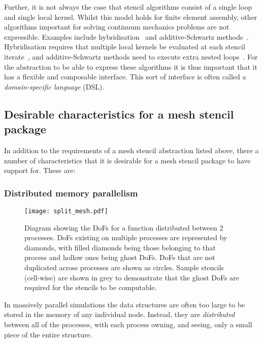 \documentclass[thesis]{subfiles}
\begin{document}
Further, it is not always the case that stencil algorithms consist of a single loop and single local kernel.
Whilst this model holds for finite element assembly, other algorithms important for solving continuum mechanics problems are not expressible.
Examples include hybridisation~\cite{arnoldMixedNonconformingFinite1985,boffi2013mixed} and additive-Schwartz methods~\cite{arnoldPRECONDITIONINGDivAPPLICATIONS1997}.
Hybridisation requires that multiple local kernels be evaluated at each stencil iterate~\cite{gibsonSlateExtendingFiredrake2020}, and additive-Schwartz methods need to execute extra nested loops~\cite{farrellPCPATCHSoftwareTopological2021}.
For the abstraction to be able to express these algorithms it is thus important that it has a flexible and composable interface.
This sort of interface is often called a \emph{domain-specific language} (DSL).

\subsection{Desirable characteristics for a mesh stencil package}
\label{sec:intro_desirable_traits}

In addition to the requirements of a mesh stencil abstraction listed above, there a number of characteristics that it is desirable for a mesh stencil package to have support for.
These are:

\subsubsection{Distributed memory parallelism}
\label{sec:intro_parallelism}

\begin{figure}
  \centering
  \texttt{[image: split\_mesh.pdf]}
  \caption{
    Diagram showing the DoFs for a function distributed between 2 processes.
    DoFs existing on multiple processes are represented by diamonds, with filled diamonds being those belonging to that process and hollow ones being ghost DoFs.
    DoFs that are not duplicated across processes are shown as circles.
    Sample stencils (cell-wise) are shown in grey to demonstrate that the ghost DoFs are required for the stencils to be computable.
  }
  \label{fig:pyop2_split_mesh}
\end{figure}

In massively parallel simulations the data structures are often too large to be stored in the memory of any individual node.
Instead, they are \emph{distributed} between all of the processes, with each process owning, and seeing, only a small piece of the entire structure.
\end{document}
